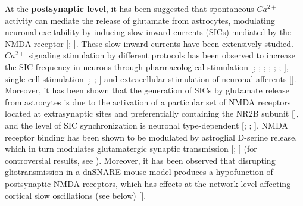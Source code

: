 At the \textbf{postsynaptic level}, it has been suggested that spontaneous $Ca^{2+}$ activity can mediate the release of glutamate from astrocytes, modulating neuronal excitability by inducing slow inward currents (SICs) mediated by the NMDA receptor [\cite{parri2001spontaneous}; \cite{gomez2018insights}].
These slow inward currents have been extensively studied.
$Ca^{2+}$ signaling stimulation by different protocols has been observed to increase the SIC frequency in neurons through pharmacological stimulation [\cite{angulo2004}; \cite{kang2005astrocytic}; \cite{kozlov2006target}; \cite{fellin2006purinergic}; \cite{nestor2007plasticity}; \cite{navarrete2008endocannabinoids}; \cite{shigetomi2008two}], single-cell stimulation [\cite{d2007mglur5}; \cite{fellin2004neuronal}; \cite{perea2005}] and extracellular stimulation of neuronal afferents [\cite{fellin2004neuronal}].
Moreover, it has been shown that the generation of SICs by glutamate release from astrocytes is due to the activation of a particular set of NMDA receptors located at extrasynaptic sites and preferentially containing the NR2B subunit [\cite{fellin2004neuronal}], and the level of SIC synchronization is neuronal type-dependent [\cite{fellin2004neuronal}; \cite{angulo2004}; \cite{kozlov2006target}].
NMDA receptor binding has been shown to be modulated by astroglial D-serine release, which in turn modulates glutamatergic synaptic transmission [\cite{panatier2006}; \cite{henneberger2010}] (for controversial results, see \cite{wolosker2016rise}). 
Moreover, it has been observed that disrupting gliotransmission in a dnSNARE mouse model produces a hypofunction of postsynaptic NMDA receptors, which has effects at the network level affecting cortical slow oscillations (see below) [\cite{fellin2009}].

